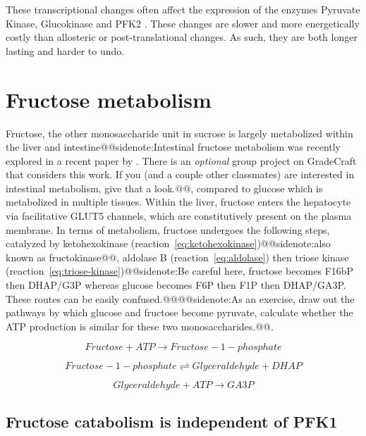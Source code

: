 \documentclass{tufte-handout}
\makeatletter
\def\sidenote#1{@@sidenote:#1@@}
\makeatother
\begin{document}
These transcriptional changes often affect the expression of the enzymes Pyruvate Kinase, Glucokinase and PFK2 \citep{Semenza1994,Kawaguchi2001}.  These changes are slower and more energetically costly than allosteric or post-translational changes.  As such, they are both longer lasting and harder to undo.

\section{Fructose metabolism}

Fructose, the other monosaccharide unit in sucrose is largely metabolized within the liver and intestine\sidenote{Intestinal fructose metabolism was recently explored in a recent paper by \citet{Jang2018}.  There is an \emph{optional} group project on GradeCraft that considers this work.  If you (and a couple other classmates) are interested in intestinal metabolism, give that a look.}, compared to glucose which is metabolized in multiple tissues.  Within the liver, fructose enters the hepatocyte via facilitative GLUT5 channels, which are constitutively present on the plasma membrane. In terms of metabolism, fructose undergoes the following steps, catalyzed by ketohexokinase (reaction~\ref{eq:ketohexokinase})\sidenote{also known as fructokinase}, aldolase B (reaction~\ref{eq:aldolase}) then triose kinase (reaction~\ref{eq:triose-kinase})\sidenote{Be careful here, fructose becomes F16bP then DHAP/G3P whereas glucose becomes F6P then F1P then DHAP/GA3P.  These routes can be easily confused.}\sidenote{As an exercise, draw out the pathways by which glucose and fructose become pyruvate, calculate whether the ATP production is similar for these two monosaccharides.}.

\begin{equation}\label{eq:ketohexokinase}
Fructose + ATP \rightarrow Fructose-1-phosphate
\end{equation}

\begin{equation}\label{eq:aldolase}
Fructose-1-phosphate \rightleftharpoons Glyceraldehyde + DHAP
\end{equation}

\begin{equation}\label{eq:triose-kinase}
Glyceraldehyde + ATP \rightarrow GA3P
\end{equation}


\subsection{Fructose catabolism is independent of PFK1}
\end{document}
